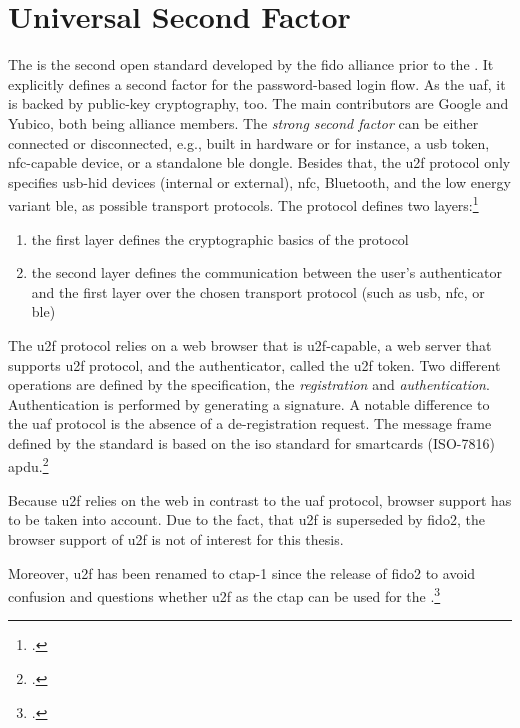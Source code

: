 \section{Universal Second Factor}
\label{mfa:u2f}

The  is the second open standard developed by the \gls{fido} alliance prior to the \wa. It explicitly defines a second factor for the password-based login flow. As the \gls{uaf}, it is backed by public-key cryptography, too. The main contributors are Google and Yubico, both being alliance members. The \textit{strong second factor} can be either connected or disconnected, e.g., built in hardware or for instance, a \gls{usb} token, \gls{nfc}-capable device, or a standalone \gls{ble} dongle. Besides that, the \gls{u2f} protocol only specifies \gls{usb}-\gls{hid} devices (internal or external), \gls{nfc}, Bluetooth, and the low energy variant \gls{ble}, as possible transport protocols. The protocol defines two layers:\footcites[See][4]{u2f-overview}[See][4]{u2f-js-api}

\begin{enumerate}
	\item the first layer defines the cryptographic basics of the protocol
	\item the second layer defines the communication between the user's authenticator and the first layer over the chosen transport protocol (such as \gls{usb}, \gls{nfc}, or \gls{ble})
\end{enumerate}

The \gls{u2f} protocol relies on a web browser that is \gls{u2f}-capable, a web server that supports \gls{u2f} protocol, and the authenticator, called the \gls{u2f} token. Two different operations are defined by the specification, the \textit{registration} and \textit{authentication}. Authentication is performed by generating a signature. A notable difference to the \gls{uaf} protocol is the absence of a de-registration request. The message frame defined by the standard is based on the \gls{iso} standard for smartcards (ISO-7816) \gls{apdu}.\footcites[See][3]{7860546}[See][3]{u2f-raw-message}

Because \gls{u2f} relies on the web in contrast to the \gls{uaf} protocol, browser support has to be taken into account. Due to the fact, that \gls{u2f} is superseded by \gls{fido}2, the browser support of \gls{u2f} is not of interest for this thesis.

Moreover, \gls{u2f} has been renamed to \gls{ctap}-1 since the release of \gls{fido}2 to avoid confusion and questions whether \gls{u2f} as the \gls{ctap} can be used for the \wa.\footcite[See][4]{ctap2}

